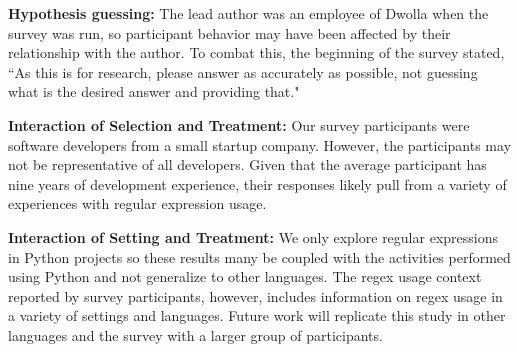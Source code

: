 \documentclass{sig-alternate}
\begin{document}

\textbf{Hypothesis guessing:} The lead author was an employee of Dwolla when the survey was run, so participant behavior may have been affected by their relationship with the author. To combat this, the beginning of the survey stated, ``As this is for research, please answer as accurately as possible, not guessing what is the desired answer and providing that."


\textbf{Interaction of Selection and Treatment:} Our survey participants were software developers from a small startup company. However, the participants may not be representative of all developers. Given that the average participant has nine years of development experience, their responses likely pull from a variety of experiences with regular expression usage.

\textbf{Interaction of Setting and Treatment:}
We only explore regular expressions in Python projects so these results many be coupled with the activities performed using Python and not generalize to other languages. The regex usage context reported by survey participants, however, includes information on  regex usage in a  variety of settings and languages. Future work will replicate this study in other languages and the survey with a larger group of participants.



%
%
%
\end{document}

